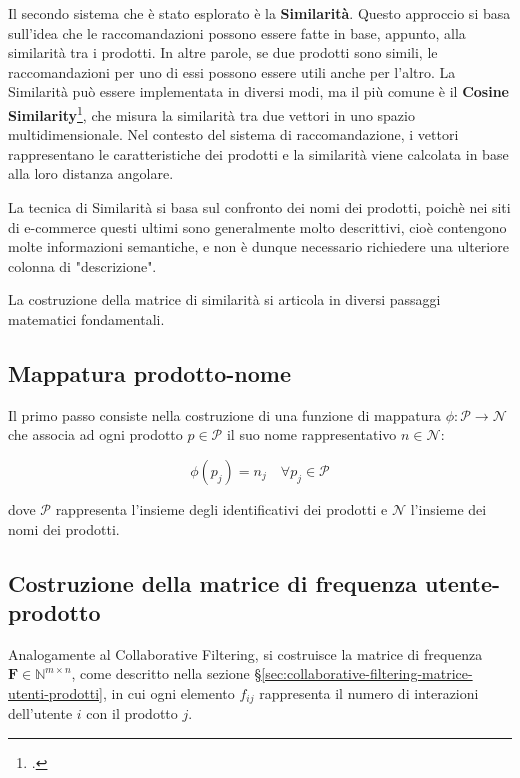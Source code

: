 Il secondo sistema che è stato esplorato è la \textbf{Similarità}. Questo approccio si basa sull'idea che le raccomandazioni possono essere fatte in base, appunto, alla similarità tra i prodotti. In altre parole, se due prodotti sono simili, le raccomandazioni per uno di essi possono essere utili anche per l'altro. La Similarità può essere implementata in diversi modi, ma il più comune è il \textbf{Cosine Similarity}\footcite{site:cosine-similarity}, che misura la similarità tra due vettori in uno spazio multidimensionale. Nel contesto del sistema di raccomandazione, i vettori rappresentano le caratteristiche dei prodotti e la similarità viene calcolata in base alla loro distanza angolare.

La tecnica di Similarità si basa sul confronto dei nomi dei prodotti, poichè nei siti di e-commerce questi ultimi sono generalmente molto descrittivi, cioè contengono molte informazioni semantiche, e non è dunque necessario richiedere una ulteriore colonna di "descrizione".

La costruzione della matrice di similarità si articola in diversi passaggi matematici fondamentali.

\subsection{Mappatura prodotto-nome}

Il primo passo consiste nella costruzione di una funzione di mappatura $\phi: \mathcal{P} \rightarrow \mathcal{N}$ che associa ad ogni prodotto $p \in \mathcal{P}$ il suo nome rappresentativo $n \in \mathcal{N}$:

\begin{equation}
\phi(p_j) = n_j \quad \forall p_j \in \mathcal{P}
\end{equation}

dove $\mathcal{P}$ rappresenta l'insieme degli identificativi dei prodotti e $\mathcal{N}$ l'insieme dei nomi dei prodotti.

\subsection{Costruzione della matrice di frequenza utente-prodotto}

Analogamente al Collaborative Filtering, si costruisce la matrice di frequenza $\mathbf{F} \in \mathbb{N}^{m \times n}$, come descritto nella sezione \S\ref{sec:collaborative-filtering-matrice-utenti-prodotti}, in cui ogni elemento $f_{ij}$ rappresenta il numero di interazioni dell'utente $i$ con il prodotto $j$.

